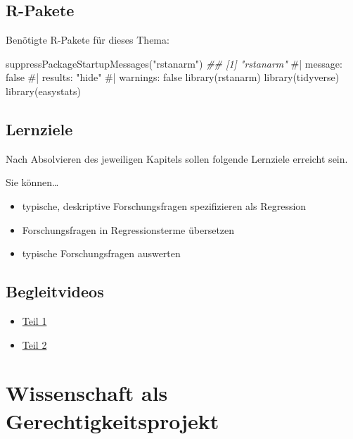 \documentclass[
  a4paper,
  DIV=11]{scrreprt}
\newenvironment{Shaded}{\begin{snugshade}}{\end{snugshade}}
\newcommand{\CommentTok}[1]{\textcolor[rgb]{0.37,0.37,0.37}{#1}}
\newcommand{\DocumentationTok}[1]{\textcolor[rgb]{0.37,0.37,0.37}{\textit{#1}}}
\newcommand{\FunctionTok}[1]{\textcolor[rgb]{0.28,0.35,0.67}{#1}}
\newcommand{\NormalTok}[1]{\textcolor[rgb]{0.00,0.23,0.31}{#1}}
\newcommand{\StringTok}[1]{\textcolor[rgb]{0.13,0.47,0.30}{#1}}
\providecommand{\tightlist}{%
  \setlength{\itemsep}{0pt}\setlength{\parskip}{0pt}}\usepackage{longtable,booktabs,array}
\theoremstyle{definition}
\theoremstyle{remark}
\begin{document}
\hypertarget{r-pakete}{%
\subsection{R-Pakete}\label{r-pakete}}

Benötigte R-Pakete für dieses Thema:

\begin{Shaded}
\begin{Highlighting}[]
\FunctionTok{suppressPackageStartupMessages}\NormalTok{(}\StringTok{"rstanarm"}\NormalTok{)}
\DocumentationTok{\#\# [1] "rstanarm"}
\CommentTok{\#| message: false}
\CommentTok{\#| results: "hide"}
\CommentTok{\#| warnings: false}
\FunctionTok{library}\NormalTok{(rstanarm)}
\FunctionTok{library}\NormalTok{(tidyverse)}
\FunctionTok{library}\NormalTok{(easystats)}
\end{Highlighting}
\end{Shaded}

\hypertarget{lernziele-9}{%
\subsection{Lernziele}\label{lernziele-9}}

Nach Absolvieren des jeweiligen Kapitels sollen folgende Lernziele
erreicht sein.

Sie können\ldots{}

\begin{itemize}
\tightlist
\item
  typische, deskriptive Forschungsfragen spezifizieren als Regression
\item
  Forschungsfragen in Regressionsterme übersetzen
\item
  typische Forschungsfragen auswerten
\end{itemize}

\hypertarget{begleitvideos-6}{%
\subsection{Begleitvideos}\label{begleitvideos-6}}

\begin{itemize}
\tightlist
\item
  \href{https://youtu.be/WQOmGUyMkxU}{Teil 1}
\item
  \href{https://youtu.be/k-CB0VGRENY}{Teil 2}
\end{itemize}

\hypertarget{wissenschaft-als-gerechtigkeitsprojekt}{%
\section{Wissenschaft als
Gerechtigkeitsprojekt}\label{wissenschaft-als-gerechtigkeitsprojekt}}
\end{document}
